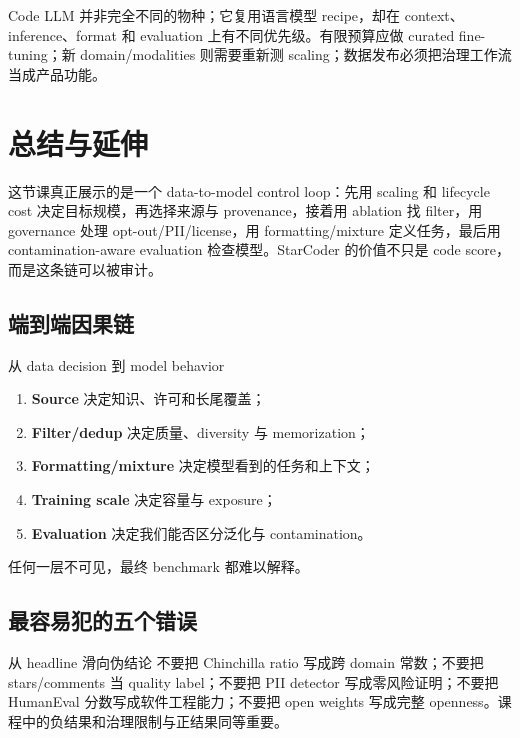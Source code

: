 \documentclass[a4paper]{article}
\begin{document}
Code LLM 并非完全不同的物种；它复用语言模型 recipe，却在 context、inference、format 和 evaluation 上有不同优先级。有限预算应做 curated fine-tuning；新 domain/modalities 则需要重新测 scaling；数据发布必须把治理工作流当成产品功能。

\section{总结与延伸}

这节课真正展示的是一个 data-to-model control loop：先用 scaling 和 lifecycle cost 决定目标规模，再选择来源与 provenance，接着用 ablation 找 filter，用 governance 处理 opt-out/PII/license，用 formatting/mixture 定义任务，最后用 contamination-aware evaluation 检查模型。StarCoder 的价值不只是 code score，而是这条链可以被审计。

\subsection{端到端因果链}

\begin{importantbox}{从 data decision 到 model behavior}
\begin{enumerate}
  \item \textbf{Source} 决定知识、许可和长尾覆盖；
  \item \textbf{Filter/dedup} 决定质量、diversity 与 memorization；
  \item \textbf{Formatting/mixture} 决定模型看到的任务和上下文；
  \item \textbf{Training scale} 决定容量与 exposure；
  \item \textbf{Evaluation} 决定我们能否区分泛化与 contamination。
\end{enumerate}
任何一层不可见，最终 benchmark 都难以解释。
\end{importantbox}

\subsection{最容易犯的五个错误}

\begin{warningbox}{从 headline 滑向伪结论}
不要把 Chinchilla ratio 写成跨 domain 常数；不要把 stars/comments 当 quality label；不要把 PII detector 写成零风险证明；不要把 HumanEval 分数写成软件工程能力；不要把 open weights 写成完整 openness。课程中的负结果和治理限制与正结果同等重要。
\end{warningbox}
\end{document}
